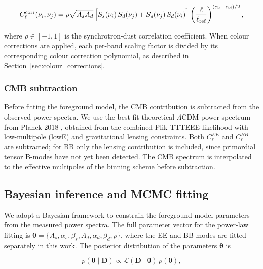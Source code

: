 \begin{equation}
    \label{eq:corr_model}
C_\ell^{\rm corr}(\nu_i, \nu_j) = \rho \sqrt{A_s A_d}\,
\Big[ S_s(\nu_i)\, S_d(\nu_j) + S_s(\nu_j)\, S_d(\nu_i) \Big]
\left(\frac{\ell}{\ell_{\rm ref}}\right)^{(\alpha_s + \alpha_d)/2},
\end{equation}

where $\rho \in [-1, 1]$ is the synchrotron-dust correlation coefficient. When colour corrections are applied, each per-band scaling factor is divided by its corresponding colour correction polynomial, as described in Section~\ref{sec:colour_corrections}.

\subsubsection{CMB subtraction}

Before fitting the foreground model, the CMB contribution is subtracted from the observed power spectra. We use the best-fit theoretical $\Lambda$CDM power spectrum from Planck 2018 \citep{Planck_2018VI}, obtained from the combined Plik TTTEEE likelihood with low-multipole (lowE) and gravitational lensing constraints. Both $C_\ell^{EE}$ and $C_\ell^{BB}$ are subtracted; for BB only the lensing contribution is included, since primordial tensor B-modes have not yet been detected. The CMB spectrum is interpolated to the effective multipoles of the binning scheme before subtraction.

\subsection{Bayesian inference and MCMC fitting}
\label{sec:mcmc}

We adopt a Bayesian framework to constrain the foreground model parameters from the measured power spectra. The full parameter vector for the power-law fitting is $\boldsymbol{\theta} = \{A_s, \alpha_s, \beta_s, A_d, \alpha_d, \beta_d, \rho\}$, where the EE and BB modes are fitted separately in this work. The posterior distribution of the parameters $\boldsymbol{\theta}$ is

\begin{equation}
p(\boldsymbol{\theta} \mid \mathbf{D}) \propto \mathcal{L}(\mathbf{D} \mid \boldsymbol{\theta})\, p(\boldsymbol{\theta}),
\end{equation}

